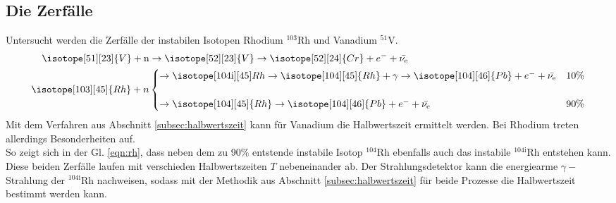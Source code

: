 \subsection{Die Zerfälle}
Untersucht werden die Zerfälle der instabilen Isotopen Rhodium $^{103}$Rh und 
Vanadium $^{51}$V.
\begin{align}
    \isotope[51][23]{V} + \text{n} &\to \isotope[52][23]{V} \to \isotope[52][24]{Cr} + e^- + \bar{\nu_{\text{e}}}\\
    \isotope[103][45]{Rh}+n&
    \begin{cases}
        \to \isotope[104\text{i}][45]{Rh} \to \isotope[104][45]{Rh}+\gamma \to \isotope[104][46]{Pb}+e^- + \bar{\nu_{\text{e}}} & 10\%\\\\
        \to \isotope[104][45]{Rh} \to \isotope[104][46]{Pb}+e^- + \bar{\nu_{\text{e}}} & 90\%
    \end{cases}
    \label{eqn:rh}
\end{align}
Mit dem Verfahren aus Abschnitt \ref{subsec:halbwertszeit} kann für Vanadium die 
Halbwertszeit ermittelt werden.
Bei Rhodium treten allerdings Besonderheiten auf.\\
So zeigt sich in der Gl. \ref{eqn:rh}, dass neben dem zu 90\% entstende instabile 
Isotop $^{104}$Rh ebenfalls auch das instabile $^{104\text{i}}$Rh entstehen kann. 
Diese beiden Zerfälle laufen mit verschieden Halbwertszeiten $T$ nebeneinander ab. 
Der Strahlungsdetektor kann die energiearme $\gamma-$Strahlung der $^{104\text{i}}$Rh 
nachweisen, sodass mit der Methodik aus Abschnitt \ref{subsec:halbwertszeit} für 
beide Prozesse die Halbwertszeit bestimmt werden kann.
